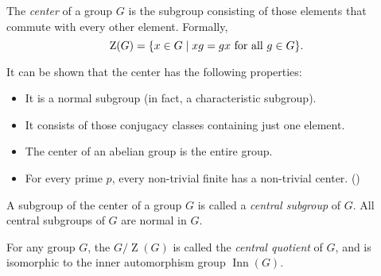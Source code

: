 \documentclass[12pt]{article}
\DeclareMathOperator{\Inn}{Inn}
\begin{document}

The \emph{center} of a group $G$ is the subgroup consisting of those elements that commute with every other element. Formally,
$$\operatorname{Z}(G) = \{x \in G \mid xg = gx\hbox{ for all }g \in G\}.$$

It can be shown that the center has the following properties:
\begin{itemize}
\item It is a normal subgroup (in fact, a characteristic subgroup).
\item It consists of those conjugacy classes containing just one element.
\item The center of an abelian group is the entire group.
\item For every prime $p$, every non-trivial finite  has a non-trivial center.
()
\end{itemize}

A subgroup of the center of a group $G$
is called a \emph{central subgroup} of $G$.
All central subgroups of $G$ are normal in $G$.

For any group $G$, the  $G/\operatorname{Z}(G)$ is called the \emph{central quotient} of $G$,
and is isomorphic to the inner automorphism group $\Inn(G)$.
\end{document}
